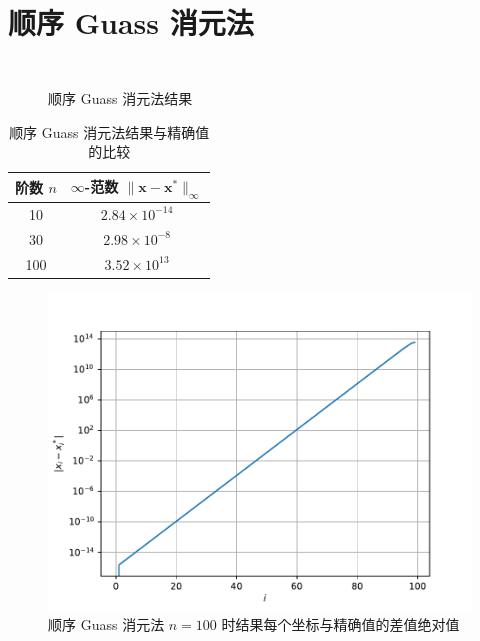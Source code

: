 \documentclass{sjtuarticle}
\begin{document}
\clearpage

\section{顺序 Guass 消元法}
\inputminted[firstline=23,lastline=47]{python3}{main.py}
\begin{minipage}{0.5\textwidth}
    \begin{figure}[H]
        \centering
        \inputminted[firstline=1,lastline=34,fontsize=\tiny]{text}{stdout.txt}
        \caption{顺序 Guass 消元法结果}
    \end{figure}
\end{minipage}
\begin{minipage}{0.45\textwidth}
    \begin{table}[H]
        \centering
        \caption{顺序 Guass 消元法结果与精确值的比较}
        \begin{tabular}{cc}
            \toprule
            阶数 $n$ & $\infty$-范数 $\lVert \bm{x}-\bm{x}^* \rVert_\infty$ \\
            \midrule
            10  & $2.84\times 10^{-14}$ \\
            30  & $2.98\times 10^{-8}$  \\
            100 & $3.52\times 10^{13}$  \\
            \bottomrule
        \end{tabular}
    \end{table}
    \vspace*{-0.75cm}
    \begin{figure}[H]
        \centering
        \includegraphics[width=\textwidth]{pic/SeqGuassSolver.pdf}
        \caption{顺序 Guass 消元法 $n=100$ 时结果每个坐标与精确值的差值绝对值}
    \end{figure}
\end{minipage}
\end{document}
